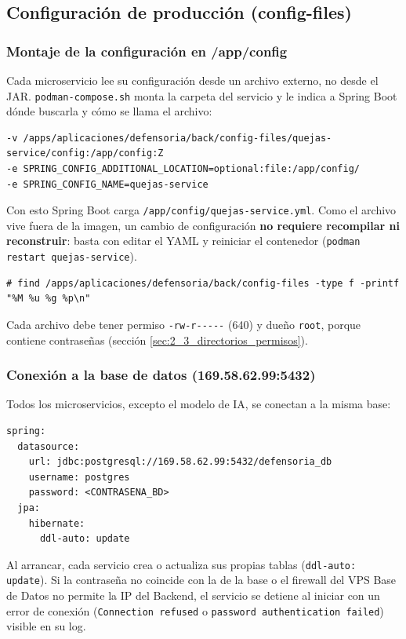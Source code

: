 \subsection{Configuración de producción (config-files)}\label{sec:6_2_configuracion}

\subsubsection{Montaje de la configuración en /app/config}
Cada microservicio lee su configuración desde un archivo externo, no desde el JAR. \texttt{podman-compose.sh} monta la carpeta del servicio y le indica a Spring Boot dónde buscarla y cómo se llama el archivo:
\begin{lstlisting}
-v /apps/aplicaciones/defensoria/back/config-files/quejas-service/config:/app/config:Z
-e SPRING_CONFIG_ADDITIONAL_LOCATION=optional:file:/app/config/
-e SPRING_CONFIG_NAME=quejas-service
\end{lstlisting}
Con esto Spring Boot carga \texttt{/app/config/quejas-service.yml}. Como el archivo vive fuera de la imagen, un cambio de configuración \textbf{no requiere recompilar ni reconstruir}: basta con editar el YAML y reiniciar el contenedor (\texttt{podman restart quejas-service}).
\begin{lstlisting}
# find /apps/aplicaciones/defensoria/back/config-files -type f -printf "%M %u %g %p\n"
\end{lstlisting}
Cada archivo debe tener permiso \verb|-rw-r-----| (640) y dueño \texttt{root}, porque contiene contraseñas (sección \ref{sec:2_3_directorios_permisos}).

\subsubsection{Conexión a la base de datos (169.58.62.99:5432)}
Todos los microservicios, excepto el modelo de IA, se conectan a la misma base:
\begin{lstlisting}
spring:
  datasource:
    url: jdbc:postgresql://169.58.62.99:5432/defensoria_db
    username: postgres
    password: <CONTRASENA_BD>
  jpa:
    hibernate:
      ddl-auto: update
\end{lstlisting}
Al arrancar, cada servicio crea o actualiza sus propias tablas (\texttt{ddl-auto: update}). Si la contraseña no coincide con la de la base o el firewall del VPS Base de Datos no permite la IP del Backend, el servicio se detiene al iniciar con un error de conexión (\texttt{Connection refused} o \texttt{password authentication failed}) visible en su log.

